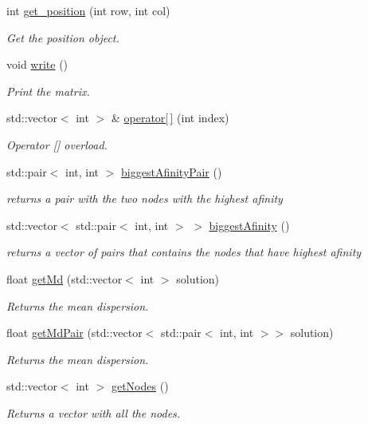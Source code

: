 \begin{DoxyCompactItemize}
int \hyperlink{classMatriz_a1894d8447d3ae6992a43e46f93422b88}{get\+\_\+position} (int row, int col)
\begin{DoxyCompactList}\small\item\em Get the position object. \end{DoxyCompactList}\item 
\mbox{\label{classMatriz_ae0fd5f42c3797c8d4b85c1d6701e0e7e}} 
void \hyperlink{classMatriz_ae0fd5f42c3797c8d4b85c1d6701e0e7e}{write} ()
\begin{DoxyCompactList}\small\item\em Print the matrix. \end{DoxyCompactList}\item 
std\+::vector$<$ int $>$ \& \hyperlink{classMatriz_ad2adc857ff1738ebfb7fe42de408737b}{operator\mbox{[}$\,$\mbox{]}} (int index)
\begin{DoxyCompactList}\small\item\em Operator \mbox{[}\mbox{]} overload. \end{DoxyCompactList}\item 
std\+::pair$<$ int, int $>$ \hyperlink{classMatriz_a30e8aba7a2868aaa98f11d3037ff8319}{biggest\+Afinity\+Pair} ()
\begin{DoxyCompactList}\small\item\em returns a pair with the two nodes with the highest afinity \end{DoxyCompactList}\item 
std\+::vector$<$ std\+::pair$<$ int, int $>$ $>$ \hyperlink{classMatriz_a2867d653d30b7fd8ca13e683bd7b8de6}{biggest\+Afinity} ()
\begin{DoxyCompactList}\small\item\em returns a vector of pairs that contains the nodes that have highest afinity \end{DoxyCompactList}\item 
float \hyperlink{classMatriz_a8df14a27d791f24206dd633b2a685c5b}{get\+Md} (std\+::vector$<$ int $>$ solution)
\begin{DoxyCompactList}\small\item\em Returns the mean dispersion. \end{DoxyCompactList}\item 
float \hyperlink{classMatriz_a61efbcc7ea661059ed0dfad32b5273cf}{get\+Md\+Pair} (std\+::vector$<$ std\+::pair$<$ int, int $>$$>$ solution)
\begin{DoxyCompactList}\small\item\em Returns the mean dispersion. \end{DoxyCompactList}\item 
std\+::vector$<$ int $>$ \hyperlink{classMatriz_a394b84a5ec13fd2f4d202ab218680afe}{get\+Nodes} ()
\begin{DoxyCompactList}\small\item\em Returns a vector with all the nodes. \end{DoxyCompactList}\end{DoxyCompactItemize}


